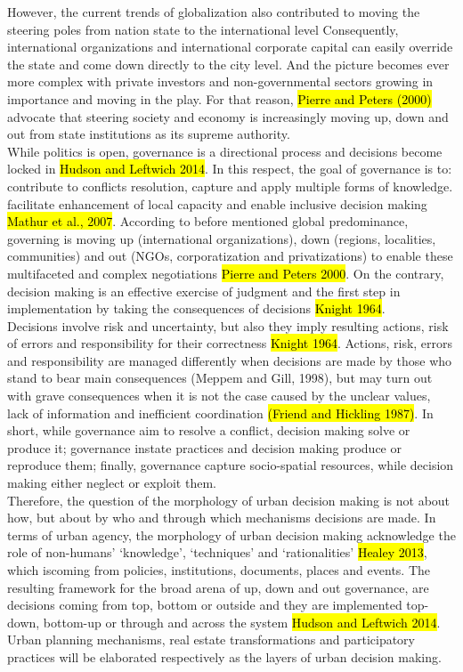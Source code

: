 \documentclass[11pt]{report}
\begin{document}
However, the current trends of globalization also contributed to moving the steering poles from nation state to the international level
Consequently, international organizations and international corporate capital can easily override the state and come down directly to the city level.
And the picture becomes ever more complex with private investors and non-governmental sectors growing in importance and moving in the play.
For that reason, \hl{Pierre and Peters (2000)} advocate that steering society and economy is increasingly moving up, down and out from  state institutions as its supreme authority.
\\
While politics is open, governance is a directional process and decisions become locked in \hl{Hudson and Leftwich 2014}.
In this respect, the goal of governance is to: contribute to conflicts resolution, capture and apply multiple  forms  of  knowledge. facilitate enhancement of local capacity and enable inclusive decision making \hl{Mathur et al., 2007}.
According to before mentioned global predominance, governing is moving up (international organizations), down (regions, localities, communities) and out (NGOs, corporatization and privatizations) to enable these multifaceted and complex negotiations \hl{Pierre and Peters 2000}.
On the contrary, decision making is an effective exercise of judgment and the first step in implementation by taking the consequences of decisions \hl{Knight 1964}.
\\
Decisions involve risk and uncertainty, but also they imply resulting actions, risk of errors and responsibility for their correctness \hl{Knight 1964}.
Actions, risk, errors and responsibility are managed differently when decisions are made by those who stand to bear main consequences (Meppem and Gill, 1998), but may turn out with grave consequences when it is not the case caused by the unclear values, lack of information and inefficient coordination \hl{(Friend and Hickling 1987)}.
In short, while governance aim to resolve a conflict, decision making solve or produce it; governance instate practices and decision making produce or reproduce them; finally, governance capture socio-spatial resources, while decision making either neglect or exploit them.
\\
Therefore, the question of the morphology of urban decision making is not about how, but about by who and through which mechanisms decisions are made.
In terms of urban agency, the morphology of urban decision making acknowledge the role of non-humans' ‘knowledge’, ‘techniques’ and ‘rationalities’ \hl{Healey 2013}, which iscoming from policies, institutions, documents, places and events.
The resulting framework for the broad arena of up, down and out governance, are decisions coming from top, bottom or outside and they are implemented top-down, bottom-up or through and across the system
\hl{Hudson and Leftwich 2014}.
Urban planning mechanisms, real estate transformations and participatory practices will be elaborated respectively as the layers of urban decision making.
\end{document}
